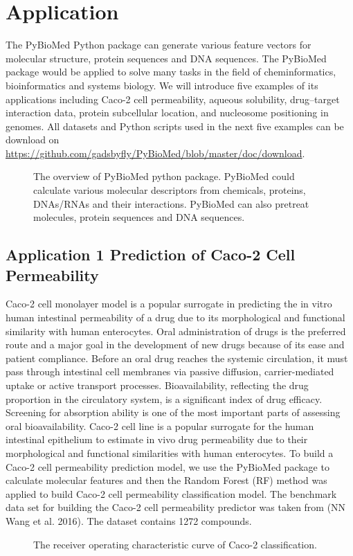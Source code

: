 \documentclass[letterpaper,10pt,english]{sphinxmanual}
\begin{document}
\chapter{Application}
\label{application:application}\label{application::doc}
The PyBioMed Python package can generate various feature vectors for molecular structure, protein sequences and DNA sequences. The PyBioMed package would be applied to solve many tasks in the field of cheminformatics, bioinformatics and systems biology. We will introduce five examples of its applications including Caco-2 cell permeability, aqueous solubility, drug–target interaction data, protein subcellular location, and nucleosome positioning in genomes. All datasets and Python scripts used in the next five examples can be download on \url{https://github.com/gadsbyfly/PyBioMed/blob/master/doc/download}.
\begin{figure}[htbp]
\centering
\capstart

\noindent{}
\caption{The overview of PyBioMed python package. PyBioMed could calculate various molecular descriptors from chemicals, proteins, DNAs/RNAs and their interactions. PyBioMed can also pretreat molecules, protein sequences and DNA sequences.}\label{application:id1}\end{figure}


\section{Application 1 Prediction of Caco-2 Cell Permeability}
\label{application:application-1-prediction-of-caco-2-cell-permeability}
Caco-2 cell monolayer model is a popular surrogate in predicting the in vitro human intestinal permeability of a drug due to its morphological and functional similarity with human enterocytes. Oral administration of drugs is the preferred route and a major goal in the development of new drugs because of its ease and patient compliance. Before an oral drug reaches the systemic circulation, it must pass through intestinal cell membranes via passive diffusion, carrier-mediated uptake or active transport processes. Bioavailability, reflecting the drug proportion in the circulatory system, is a significant index of drug efficacy. Screening for absorption ability is one of the most important parts of assessing oral bioavailability. Caco-2 cell line is a popular surrogate for the human intestinal epithelium to estimate in vivo drug permeability due to their morphological and functional similarities with human enterocytes. To build a Caco-2 cell permeability prediction model, we use the PyBioMed package to calculate molecular features and then the Random Forest (RF) method was applied to build Caco-2 cell permeability classification model. The benchmark data set for building the Caco-2 cell permeability predictor was taken from (NN Wang et al. 2016). The dataset contains 1272 compounds.
\begin{figure}[htbp]
\centering
\capstart

\noindent{}
\caption{The receiver operating characteristic curve of Caco-2 classification.}\label{application:id2}\end{figure}
\end{document}
